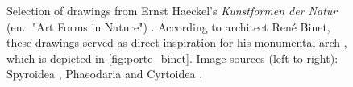 \documentclass{article}
\begin{document}
\begin{figure}[ht!]
    \centering
    \caption{Selection of drawings from Ernst Haeckel's \textit{Kunstformen der Natur} (en.: "Art Forms in Nature") \cite{haeckel_kunstformen_2012}. According to architect René Binet, these drawings served as direct inspiration for his monumental arch \cite[Sec. "Haeckel und der Jugendstil"]{willmann_haeckel_2019}, which is depicted in \cref{fig:porte_binet}. \newline Image sources (left to right): Spyroidea \cite{haeckel_kunstformen_1904}, Phaeodaria \cite{haeckel_kunstformen_1904} and Cyrtoidea \cite{haeckel_kunstformen_1904-2}.}
    \label{fig:kunstformen}
\end{figure}\vspace{-5mm}
\end{document}
